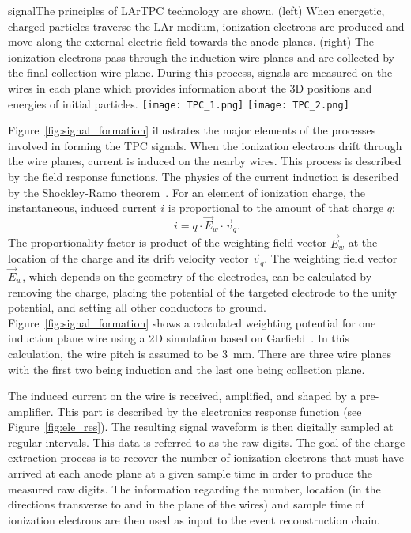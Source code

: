 \begin{cdrfigure}{signal}{The principles of LArTPC technology are shown. (left) When energetic, charged particles 
traverse the LAr medium, ionization electrons are produced and move
along the external electric field towards the anode planes. (right) The ionization
electrons pass through the induction wire planes and are  collected by the 
final collection wire plane. 
During this process, signals are measured on the wires
in each plane which provides information about the 3D positions and
energies of initial particles.}
\texttt{[image: TPC\_1.png]}
\texttt{[image: TPC\_2.png]}
\end{cdrfigure}


Figure~\ref{fig:signal_formation} illustrates the major elements of the processes 
involved in forming the TPC signals. When the ionization electrons drift through the 
wire planes, current is induced on the nearby wires. This process is described by the 
field response functions. The physics of the current induction is described by the 
Shockley-Ramo theorem~\cite{Shockley,Ramo}.  For an element of ionization charge, 
the instantaneous, induced current $i$ is proportional to the amount of that
charge $q$: 
\begin{equation}
i = q \cdot \vec{E}_{w} \cdot \vec{v}_q.
\end{equation}
The proportionality factor is product of the weighting field vector $\vec{E}_{w}$ 
at the location of the charge and its drift velocity vector $\vec{v}_q$. 
The weighting field vector $\vec{E}_{w}$, which depends on the geometry of the electrodes, 
can be calculated by removing the charge,  placing the potential of the targeted 
electrode to the unity potential, and setting all other conductors to ground. 
Figure~\ref{fig:signal_formation} shows a calculated weighting potential 
for one 
induction plane wire using a 2D simulation based on Garfield~\cite{garfield}. 
In this calculation, the wire pitch is assumed to be 3~mm. There are three wire planes 
with the first two being induction and the last one being collection plane.  

The induced current on the wire is received, amplified, and shaped by
a pre-amplifier. This part is described by the electronics response
function (see Figure~\ref{fig:ele_res}).  
The resulting signal waveform is then digitally sampled at
regular intervals.  This data is referred to as the raw digits.  The
goal of the charge extraction process is to recover the number of
ionization electrons that must have arrived at each anode plane at a
given sample time in order to produce the measured raw digits.  The
information regarding the number, location (in the directions transverse
to and in the plane of the wires) and sample time of ionization
electrons are then used as input to the event reconstruction chain.

